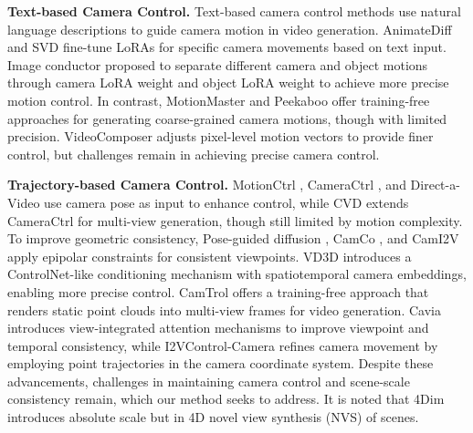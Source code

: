 \noindent\textbf{Text-based Camera Control.}
Text-based camera control methods use natural language descriptions to guide camera motion in video generation. AnimateDiff \cite{Guo2023} and SVD \cite{Blattmann2023} fine-tune LoRAs \cite{hu2021lora} for specific camera movements based on text input. 
Image conductor\cite{li2024image} proposed to separate different camera and object motions through camera LoRA weight and object LoRA weight to achieve more precise motion control.
In contrast, MotionMaster \cite{hu2024motionmaster} and Peekaboo \cite{jain2024peekaboo} offer training-free approaches for generating coarse-grained camera motions, though with limited precision. VideoComposer \cite{wang2024videocomposer} adjusts pixel-level motion vectors to provide finer control, but challenges remain in achieving precise camera control.

\noindent\textbf{Trajectory-based Camera Control.}
MotionCtrl \cite{Wang2024Motionctrl}, CameraCtrl \cite{He2024Cameractrl}, and Direct-a-Video \cite{yang2024direct} use camera pose as input to enhance control, while CVD \cite{kuang2024collaborative} extends CameraCtrl for multi-view generation, though still limited by motion complexity. To improve geometric consistency, Pose-guided diffusion \cite{tseng2023consistent}, CamCo \cite{Xu2024}, and CamI2V \cite{zheng2024cami2v} apply epipolar constraints for consistent viewpoints. VD3D \cite{bahmani2024vd3d} introduces a ControlNet\cite{Zhang2023}-like conditioning mechanism with spatiotemporal camera embeddings, enabling more precise control.
CamTrol \cite{hou2024training} offers a training-free approach that renders static point clouds into multi-view frames for video generation. Cavia \cite{xu2024cavia} introduces view-integrated attention mechanisms to improve viewpoint and temporal consistency, while I2VControl-Camera \cite{feng2024i2vcontrol} refines camera movement by employing point trajectories in the camera coordinate system. Despite these advancements, challenges in maintaining camera control and scene-scale consistency remain, which our method seeks to address. It is noted that 4Dim~\cite{watson2024controlling} introduces absolute scale but in  4D novel view synthesis (NVS) of scenes.


